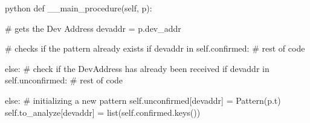 \begin{mintedbox}{python}
def __main_procedure(self, p):
    
    # gets the Dev Address
    devaddr = p.dev_addr  
    
    # checks if the pattern already exists
    if devaddr in self.confirmed:
        # rest of code

    else:
        # check if the DevAddress has already been received
        if devaddr in self.unconfirmed:
            # rest of code

        else:
            # initializing a new pattern
            self.unconfirmed[devaddr] = Pattern(p.t)
            self.to_analyze[devaddr] = list(self.confirmed.keys())
\end{mintedbox}